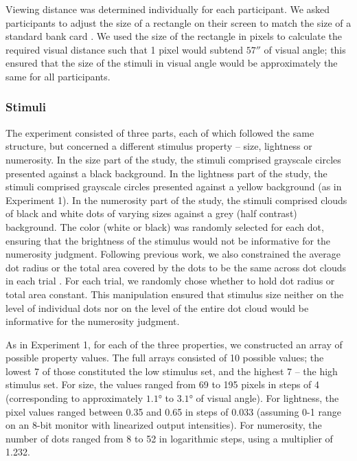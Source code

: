 \documentclass[a4paper, nobind]{templates/ociamthesis}
\begin{document}
Viewing distance was determined individually for each participant. We asked participants to adjust the size of a rectangle on their screen to match the size of a standard bank card \autocite{yung2015}. We used the size of the rectangle in pixels to calculate the required visual distance such that 1 pixel would subtend \(57''\) of visual angle; this ensured that the size of the stimuli in visual angle would be approximately the same for all participants.

\hypertarget{stimuli-4}{%
\subsubsection{Stimuli}\label{stimuli-4}}

The experiment consisted of three parts, each of which followed the same structure, but concerned a different stimulus property -- size, lightness or numerosity. In the size part of the study, the stimuli comprised grayscale circles presented against a black background. In the lightness part of the study, the stimuli comprised grayscale circles presented against a yellow background (as in Experiment 1). In the numerosity part of the study, the stimuli comprised clouds of black and white dots of varying sizes against a grey (half contrast) background. The color (white or black) was randomly selected for each dot, ensuring that the brightness of the stimulus would not be informative for the numerosity judgment. Following previous work, we also constrained the average dot radius or the total area covered by the dots to be the same across dot clouds in each trial \autocite{izard2008,vandenberg2017,heng2020}. For each trial, we randomly chose whether to hold dot radius or total area constant. This manipulation ensured that stimulus size neither on the level of individual dots nor on the level of the entire dot cloud would be informative for the numerosity judgment.

As in Experiment 1, for each of the three properties, we constructed an array of possible property values. The full arrays consisted of 10 possible values; the lowest 7 of those constituted the low stimulus set, and the highest 7 -- the high stimulus set. For size, the values ranged from 69 to 195 pixels in steps of 4 (corresponding to approximately \(1.1\)° to \(3.1\)° of visual angle). For lightness, the pixel values ranged between 0.35 and 0.65 in steps of 0.033 (assuming 0-1 range on an 8-bit monitor with linearized output intensities). For numerosity, the number of dots ranged from 8 to 52 in logarithmic steps, using a multiplier of 1.232.
\end{document}
